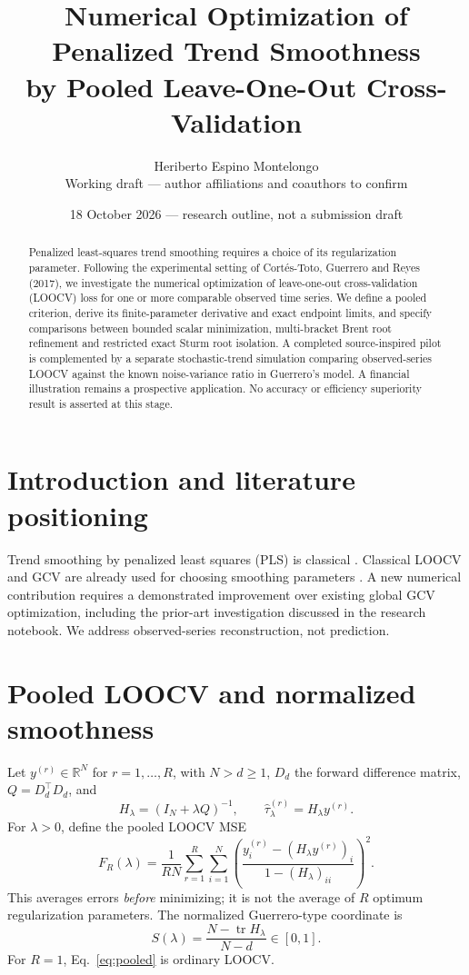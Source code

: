 \documentclass[11pt]{article}
\title{Numerical Optimization of Penalized Trend Smoothness\\
by Pooled Leave-One-Out Cross-Validation}
\author{Heriberto Espino Montelongo\\[3pt]\small Working draft --- author affiliations and coauthors to confirm}
\date{18 October 2026 --- research outline, not a submission draft}
\begin{document}
\maketitle

\begin{abstract}
Penalized least-squares trend smoothing requires a choice of its
regularization parameter. Following the experimental setting of
Cort\'es-Toto, Guerrero and Reyes (2017), we investigate the numerical
optimization of leave-one-out cross-validation (LOOCV) loss for one
or more comparable observed time series. We define a pooled criterion,
derive its finite-parameter derivative and exact endpoint limits,
and specify comparisons between bounded scalar minimization,
multi-bracket Brent root refinement and restricted exact Sturm
root isolation. A completed source-inspired pilot is complemented by a separate
stochastic-trend simulation comparing observed-series LOOCV against
the known noise-variance ratio in Guerrero's model. A financial
illustration remains a prospective application. No accuracy or
efficiency superiority result is asserted at this stage.
\end{abstract}

\section{Introduction and literature positioning}
Trend smoothing by penalized least squares (PLS) is classical
\citep{guerrero2007,cortes2017}. Classical LOOCV and GCV
are already used for choosing smoothing parameters
\citep{cortes2017,weinert2007}.
A new numerical contribution requires a demonstrated improvement
over existing global GCV optimization, including the prior-art
investigation discussed in the research notebook.
We address observed-series reconstruction, not prediction.

\section{Pooled LOOCV and normalized smoothness}
Let $y^{(r)}\in\mathbb R^N$ for $r=1,\dots,R$, with
$N>d\geq1$, $D_d$ the forward difference matrix,
$Q=D_d^\top D_d$, and
\begin{equation}
 H_\lambda=(I_N+\lambda Q)^{-1}, \qquad
 \widehat\tau_\lambda^{(r)}=H_\lambda y^{(r)}.
\end{equation}
For $\lambda>0$, define the pooled LOOCV MSE
\begin{equation}\label{eq:pooled}
 F_R(\lambda)=\frac1{RN}\sum_{r=1}^{R}\sum_{i=1}^{N}
 \left(\frac{y_i^{(r)}-(H_\lambda y^{(r)})_i}
 {1-(H_\lambda)_{ii}}\right)^2.
\end{equation}
This averages errors \emph{before} minimizing;
it is not the average of $R$ optimum regularization parameters.
The normalized Guerrero-type coordinate is
\begin{equation}
 S(\lambda)=\frac{N-\operatorname{tr}H_\lambda}{N-d}
 \in[0,1].
\end{equation}
For $R=1$, Eq.~\eqref{eq:pooled} is ordinary LOOCV.
\end{document}
